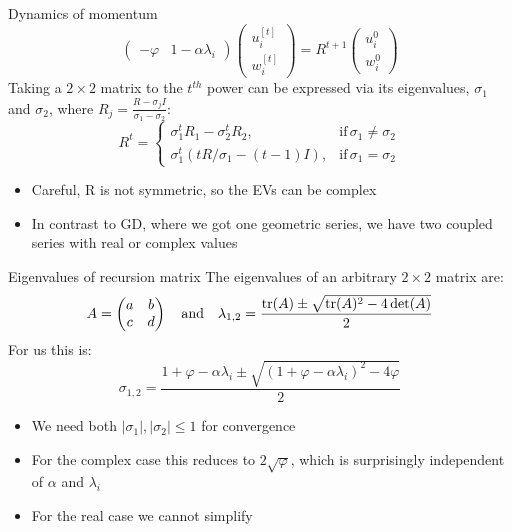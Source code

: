 \documentclass[11pt,compress,t,notes=noshow, xcolor=table]{beamer}
\begin{document}
\begin{framev}[fs=footnotesize]{Dynamics of momentum}
$$\begin{pmatrix}
-\varphi & 1 - \alpha \lambda_i
\end{pmatrix}
\begin{pmatrix}
u_i^{[ t ] } \\
w_i^{[ t ] }
\end{pmatrix} = R^{ t+1 }
\begin{pmatrix}
u_i^{0} \\
w_i^{0}
\end{pmatrix}
$$
Taking a $2 \times 2$ matrix to the $t^{th}$ power can be expressed via its eigenvalues,
$\sigma_1$ and $\sigma_2$, where $R_j = \frac{R - \sigma_j I}{\sigma_1 - \sigma_2}$:
$$
R^t = \begin{cases}
\sigma_1^t R_1 - \sigma_2^t R_2, & \text{if} \, \sigma_1 \neq \sigma_2 \\
\sigma_1^t (t R/\sigma_1 - (t-1) I), & \text{if} \, \sigma_1 = \sigma_2
\end{cases}
$$
\begin{itemize}
\item Careful, R is not symmetric, so the EVs can be complex
\item In contrast to GD, where we got one geometric series, we have two coupled series with real or complex values
\end{itemize}
\end{framev}


\begin{framev}{Eigenvalues of recursion matrix}
The eigenvalues of an arbitrary $2 \times 2$ matrix are:
$$
A = \begin{pmatrix} a & b \\ c & d \end{pmatrix}\quad \text{and}\quad
\lambda_{1,2} = \frac{\operatorname{tr}(A) \pm \sqrt{ \operatorname{tr}(A)^2 - 4 \det(A)}}{2}
$$
For us this is:
$$
\sigma_{1,2} = \frac{1 + \varphi - \alpha \lambda_i \pm \sqrt{ (1 + \varphi - \alpha \lambda_i)^2 - 4 \varphi }}{2}
$$
\begin{itemize}
\item We need both $|\sigma_1|, |\sigma_2| \leq 1$ for convergence
\item For the complex case this reduces to $2 \sqrt{\varphi}$, which is surprisingly independent of $\alpha$ and $\lambda_i$
\item For the real case we cannot simplify
\end{itemize}
\end{framev}
\end{document}
